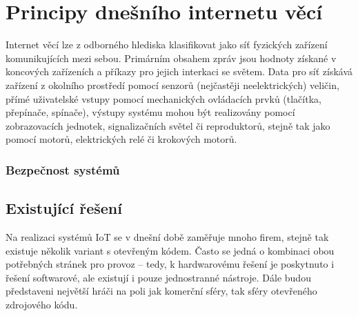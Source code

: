 \chapter{Principy dnešního internetu věcí}
\label{ch:principy-iot}
Internet věcí lze z odborného hlediska klasifikovat jako síť fyzických zařízení komunikujících mezi sebou.
Primárním obsahem zpráv jsou hodnoty získané v koncových zařízeních a příkazy pro jejich interkaci se světem.
Data pro síť získává zařízení z okolního prostředí pomocí senzorů (nejčastěji neelektrických) veličin, přímé
uživatelské vstupy pomocí mechanických ovládacích prvků (tlačítka, přepínače, spínače), výstupy systému mohou být
realizovány pomocí zobrazovacích jednotek, signalizačních světel či reproduktorů, stejně tak jako pomocí motorů,
elektrických relé či krokových motorů.



\subsection{Bezpečnost systémů}


\section{Existující řešení}\label{sec:existujici-reseni}

Na realizaci systémů IoT se v dnešní době zaměřuje mnoho firem, stejně tak existuje několik variant s otevřeným kódem.
Často se jedná o kombinaci obou potřebných stránek pro provoz -- tedy, k hardwarovému řešení je poskytnuto i řešení
softwarové, ale existují i pouze jednostranné nástroje.
Dále budou představeni největší hráči na poli jak komerční sféry, tak sféry otevřeného zdrojového kódu.


